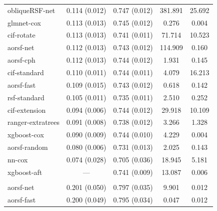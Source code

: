 \documentclass{article}\usepackage[]{graphicx}\usepackage[]{xcolor}
\newenvironment{knitrout}{}{} %
\begin{document}
\begin{knitrout}
\begin{longtable}[t]{lcccc}
\hline
\hspace{1em}obliqueRSF-net & 0.114 (0.012) & 0.747 (0.012) & 381.891 & 25.692\\
\hspace{1em}glmnet-cox & 0.113 (0.013) & 0.745 (0.012) & 0.276 & 0.004\\
\hspace{1em}cif-rotate & 0.113 (0.013) & 0.741 (0.011) & 71.714 & 10.523\\
\hspace{1em}aorsf-net & 0.112 (0.013) & 0.743 (0.012) & 114.909 & 0.160\\
\hspace{1em}aorsf-cph & 0.112 (0.013) & 0.744 (0.012) & 1.931 & 0.145\\
\hspace{1em}cif-standard & 0.110 (0.011) & 0.744 (0.011) & 4.079 & 16.213\\
\hspace{1em}aorsf-fast & 0.109 (0.015) & 0.743 (0.012) & 0.618 & 0.142\\
\hspace{1em}rsf-standard & 0.105 (0.011) & 0.735 (0.011) & 2.510 & 0.252\\
\hspace{1em}cif-extension & 0.094 (0.006) & 0.744 (0.012) & 29.918 & 10.109\\
\hspace{1em}ranger-extratrees & 0.091 (0.008) & 0.738 (0.012) & 3.266 & 1.328\\
\hspace{1em}xgboost-cox & 0.090 (0.009) & 0.744 (0.010) & 4.229 & 0.004\\
\hspace{1em}aorsf-random & 0.080 (0.006) & 0.731 (0.013) & 2.025 & 0.143\\
\hspace{1em}nn-cox & 0.074 (0.028) & 0.705 (0.036) & 18.945 & 5.181\\
\hspace{1em}xgboost-aft & --- & 0.741 (0.009) & 13.087 & 0.006\\
\addlinespace[0.3em]
\multicolumn{5}{l}{\textit{\textbf{VA lung cancer trial; death, n = 137, p = 8}}}\\
\hline
\hspace{1em}aorsf-net & 0.201 (0.050) & 0.797 (0.035) & 9.901 & 0.012\\
\hspace{1em}aorsf-fast & 0.200 (0.049) & 0.795 (0.034) & 0.047 & 0.012\\

\end{longtable}
\end{knitrout}
\end{document}
